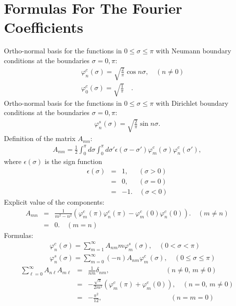 \documentclass[a4paper,12pt]{article}
\newcommand{\nn}{\nonumber\\}
\newcommand{\co}{\varphi^c}
\newcommand{\si}{\varphi^s}
\begin{document}
\newpage
\appendix
\section{Formulas %
For The Fourier Coefficients}
%
Ortho-normal basis 
for the functions in $0 \le \sigma \le \pi$ 
with Neumann boundary conditions at the boundaries
$\sigma = 0,\pi$:
\begin{eqnarray}
 \label{defcoa}
&&\co_n(\sigma) = \sqrt{\frac{2}{\pi}} \cos n \sigma,
 \quad (n \ne 0) \nn
&&\co_0(\sigma) = \sqrt{\frac{1}{\pi}} \quad.
\end{eqnarray}
Ortho-normal basis 
for the functions in $0 \le \sigma \le \pi$ 
with Dirichlet boundary conditions at the boundaries
$\sigma = 0,\pi$:
\begin{eqnarray}
 \label{defsa}
\si_n(\sigma) = \sqrt{\frac{2}{\pi}} \sin n \sigma  .
\end{eqnarray}
Definition of the matrix $A_{mn}$:
\begin{eqnarray}
A_{mn} = \frac{1}{2}
\int_0^\pi d\sigma
\int_0^\pi d\sigma'
\epsilon(\sigma-\sigma') \co_m(\sigma) \co_n(\sigma'),
\end{eqnarray}
where $\epsilon(\sigma)$ is the sign function
\begin{eqnarray}
 \label{signa}
\epsilon(\sigma) &=& 1, \quad \,\,\, (\sigma > 0 )\nn
                 &=& 0, \quad \,\,\, (\sigma = 0 )\nn
                 &=& -1. \quad (\sigma < 0 )
\end{eqnarray}
Explicit value of the components:
\begin{eqnarray}
 \label{Amn}
A_{mn} &=&
\frac{1}{m^2-n^2}
\left(
\co_m(\pi)\co_n(\pi)-\co_m(0)\co_n(0)
\right).\quad (m\ne n) \nn
&=& 0. \quad (m=n)
\end{eqnarray}
Formulas:
\begin{eqnarray}
 \label{Acosi}
&&\co_n(\sigma) = \sum_{m=1}^\infty A_{nm} m \si_m(\sigma), 
\quad (0<\sigma<\pi)\\
&&\si_n(\sigma) = \sum_{m=0}^\infty (-n) A_{nm}  \co_m(\sigma),
\quad (0\le\sigma\le\pi)
\end{eqnarray}
%
\begin{eqnarray}
 \label{fA1}
\sum_{\ell=0}^\infty
A_{n\ell}A_{m\ell}
&=& \frac{1}{nm} \delta_{nm}, 
\qquad \qquad \qquad  \qquad \, (n\ne 0, \, m\ne0)
\nn
&=& -\frac{\sqrt{\pi}}{2m^2} 
 \left(
  \co_m(\pi)+\co_m(0)
 \right), 
\quad (n=0,\, m\ne 0)\nn
&=& -\frac{\pi^2}{12} ,\qquad \qquad \qquad \qquad \qquad (n=m=0)
\end{eqnarray}
\end{document}

